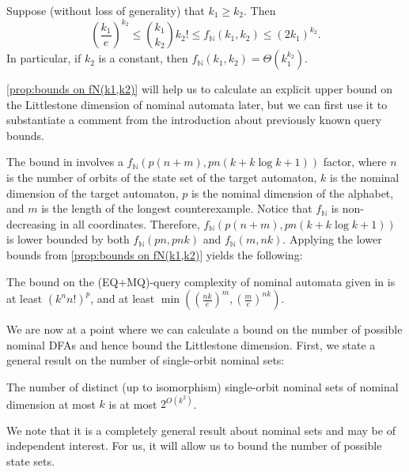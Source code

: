 \documentclass[runningheads]{llncs}
\newcommand{\bb}{\mathbb}
\newif\ifappendix
\begin{document}
\begin{proposition} \label{prop:bounds on fN(k1,k2)}
    Suppose (without loss of generality) that $k_1 \geq k_2$. 
    Then 
    \[
        \left(\frac{k_1}{e}\right)^{k_2} \leq \binom{k_1}{k_2} k_2! \leq f_{\bb N}(k_1, k_2) \leq (2k_1)^{k_2}.
    \]
    In particular, if $k_2$ is a constant, then $f_{\bb N}(k_1, k_2) = \Theta(k_1^{k_2})$.
\end{proposition}

\ifappendix The proof of \autoref{prop:bounds on fN(k1,k2)} is given in Appendix \ref{appendix:proof of bounds on fN(k1,k2)}. \fi
\autoref{prop:bounds on fN(k1,k2)} will help us to calculate an explicit upper bound on the Littlestone dimension of nominal automata later, but we can first use it to substantiate a comment from the introduction about previously known query bounds.

The bound in \cite[Corollary 1]{moerman-etal:learning-nominal-automata} involves a $f_{\bb N}(p(n+m), pn(k+k\log k+1))$ factor, where $n$ is the number of orbits of the state set of the target automaton, $k$ is the nominal dimension of the target automaton, $p$ is the nominal dimension of the alphabet, and $m$ is the length of the longest counterexample.
Notice that $f_{\bb N}$ is non-decreasing in all coordinates. 
Therefore, $f_{\bb N}(p(n+m), pn(k+k\log k+1))$ is lower bounded by both $f_{\bb N}(pn, pnk)$ and $f_{\bb N}(m, nk)$.
Applying the lower bounds from \autoref{prop:bounds on fN(k1,k2)} yields the following:
\begin{remark} \label{remark:factorial bounds in moerman etal}
    The bound on the (EQ+MQ)-query complexity of nominal automata given in \cite[Corollary 1]{moerman-etal:learning-nominal-automata} is at least $(k^n n!)^p$, and at least $\min\left(\left(\frac{nk}{e}\right)^m, \left(\frac{m}{e}\right)^{nk}\right)$.
\end{remark}


We are now at a point where we can calculate a bound on the number of possible nominal DFAs and hence bound the Littlestone dimension. 
First, we state a general result on the number of single-orbit nominal sets:

\begin{proposition} \label{prop:number of single orbit nominal sets}
    The number of distinct (up to isomorphism) single-orbit nominal sets of nominal dimension at most $k$ is at most $2^{O(k^2)}$.
\end{proposition}

\ifappendix The proof of \autoref{prop:number of single orbit nominal sets} is given in Appendix \ref{appendix:proof of number of single orbit nominal sets}. \fi
We note that it is a completely general result about nominal sets and may be of independent interest.
For us, it will allow us to bound the number of possible state sets.
\end{document}
